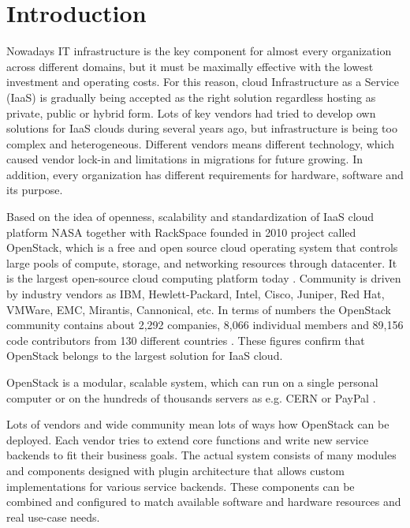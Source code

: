 
\section{Introduction}


Nowadays IT infrastructure is the key component for almost every organization across different domains, but it must be maximally effective with the lowest investment and operating costs.
For this reason, cloud Infrastructure as a Service (IaaS) is gradually being accepted as the right solution regardless hosting as private, public or hybrid form. Lots of key vendors had tried to develop own solutions for IaaS clouds during several years ago,
but infrastructure is being too complex and heterogeneous. Different vendors means different technology, which caused vendor lock-in and limitations in migrations for future growing. In addition, every organization has different requirements for hardware, software and its purpose. 

Based on the idea of openness, scalability and standardization of IaaS cloud platform NASA together with RackSpace founded in 2010 project called OpenStack, which is a free and open source cloud operating system that controls large pools of compute, storage, and networking resources through
datacenter. It is the largest open-source cloud computing platform today \cite{OpenStack}. Community is driven by industry vendors as IBM, Hewlett-Packard, Intel, Cisco, Juniper, Red Hat, VMWare, EMC, Mirantis, Cannonical, etc. In terms of numbers the OpenStack community contains about 2,292 companies, 8,066 individual members and 89,156 code contributors from 130 different countries \cite{STACKALYTICS}.
These figures confirm that OpenStack belongs to the largest solution for IaaS cloud.

OpenStack is a modular, scalable system, which can run on a single personal computer or on the hundreds of thousands servers as e.g. CERN \cite{CERN} or PayPal \cite{PayPal}.

Lots of vendors and wide community mean lots of ways how OpenStack can be deployed.
Each vendor tries to extend core functions and write new service backends to fit their business goals. The actual system consists of many modules and components designed with plugin architecture that allows custom implementations for various service backends. These components can be combined and configured to match available software and hardware resources and real use-case needs.

